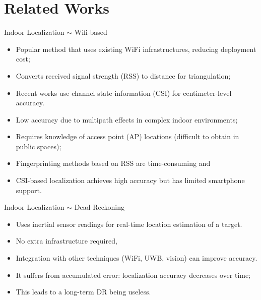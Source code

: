 \section{Related Works}
\begin{frame}{Indoor Localization $\sim$ Wifi-based}

	\begin{itemize}[<+->]
		\item Popular method that uses existing WiFi infrastructures, reducing deployment cost;
		\item Converts received signal strength (RSS) to distance for triangulation;
		\item Recent works use channel state information (CSI) for centimeter-level accuracy.
	\end{itemize}
	\pause
	\begin{itemize}[<+->]
		\item Low accuracy due to multipath effects in complex indoor environments;
		\item Requires knowledge of access point (AP) locations (difficult to obtain in public spaces);
		\item Fingerprinting methods based on RSS are time-consuming and
		\item CSI-based localization achieves high accuracy but has limited smartphone support.
	\end{itemize}

\end{frame}

\begin{frame}{Indoor Localization $\sim$ Dead Reckoning}
	\begin{itemize}[<+->]
		\item Uses inertial sensor readings for real-time location estimation of a target.
		\item No extra infrastructure required,
		\item Integration with other techniques (WiFi, UWB, vision) can improve accuracy.
	\end{itemize}
	\pause
	\begin{itemize}[<+->]
		\item It suffers from accumulated error: localization accuracy decreases over time;
		\item This leads to a long-term DR being useless.
	\end{itemize}
\end{frame}


